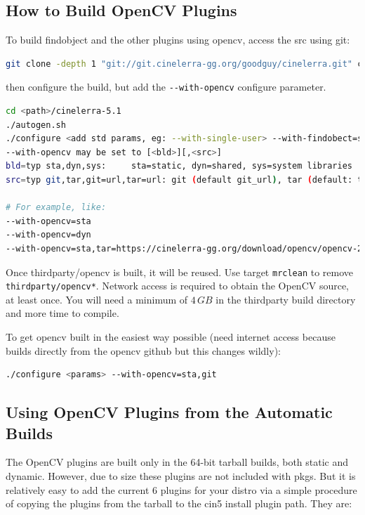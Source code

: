 {\subsection{How to Build OpenCV Plugins}%
\label{sub:how_build_opencv_plugins}

To build findobject and the other plugins using opencv, access the src using git:

\begin{lstlisting}[language=Bash,numbers=none]
git clone -depth 1 "git://git.cinelerra-gg.org/goodguy/cinelerra.git" cinelerra5
\end{lstlisting}

then configure the build, but add the \texttt{-{}-with-opencv} configure parameter.

\begin{lstlisting}[language=Bash,numbers=none]
cd <path>/cinelerra-5.1
./autogen.sh
./configure <add std params, eg: --with-single-user> --with-findobect=sta
--with-opencv may be set to [<bld>][,<src>]
bld=typ sta,dyn,sys:	 sta=static, dyn=shared, sys=system libraries
src=typ git,tar,git=url,tar=url: git (default git_url), tar (default: tar_url)

# For example, like:
--with-opencv=sta
--with-opencv=dyn
--with-opencv=sta,tar=https://cinelerra-gg.org/download/opencv/opencv-20180401.tgz
\end{lstlisting}

Once thirdparty/opencv is built, it will be reused. Use target \texttt{mrclean} to remove \texttt{thirdparty/opencv*}.
Network access is required to obtain the OpenCV source, at least once. You will need a minimum of 
$4\, GB$ in the thirdparty build directory and more time to compile.

To get opencv built in the easiest way possible (need internet access because builds directly from the opencv github but this changes wildly):

\begin{lstlisting}[language=Bash,numbers=none]
./configure <params> --with-opencv=sta,git
\end{lstlisting}

\subsection{Using OpenCV Plugins from the Automatic Builds}%
\label{sub:using_opencv_automatic_builds}

The OpenCV plugins are built only in the 64-bit tarball builds, both static and dynamic. However, due to size these plugins are not included with pkgs. But it is relatively easy to add the current 6 plugins for your distro via a simple procedure of copying the plugins from the tarball to the cin5 install plugin path. They are: 

}
